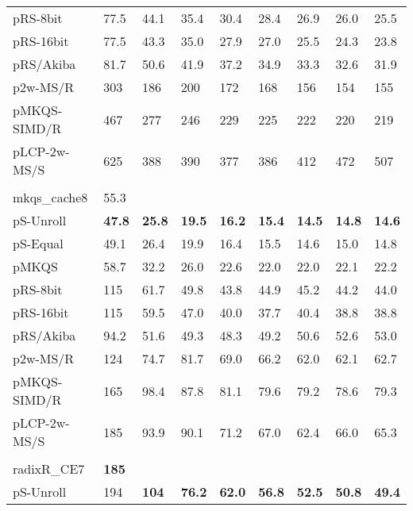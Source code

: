 \documentclass[a4paper]{myjournal}
\begin{document}
\begin{table}
\begin{tabularx}{\linewidth}{l|*{8}{>{\hfill}X}|@{}}
     pRS-8bit & 77.5 &     44.1 &     35.4 &     30.4 &     28.4 &     26.9 &     26.0 &     25.5 \\
    pRS-16bit & 77.5 &     43.3 &     35.0 &     27.9 &     27.0 &     25.5 &     24.3 &     23.8 \\
    pRS/Akiba & 81.7 &     50.6 &     41.9 &     37.2 &     34.9 &     33.3 &     32.6 &     31.9 \\
     p2w-MS/R &  303 &      186 &      200 &      172 &      168 &      156 &      154 &      155 \\
 pMKQS-SIMD/R &  467 &      277 &      246 &      229 &      225 &      222 &      220 &      219 \\
 pLCP-2w-MS/S &  625 &      388 &      390 &      377 &      386 &      412 &      472 &      507 \\ \hline
& \multicolumn{8}{l|}{\textbf{GOV2}, , , } \\ \cline{2-9}
mkqs\_cache8 & 55.3 &  &  &  &  &  &  &  \\
pS-Unroll & \bf 47.8 & \bf 25.8 & \bf 19.5 & \bf 16.2 & \bf 15.4 & \bf 14.5 & \bf 14.8 & \bf 14.6 \\
 pS-Equal &     49.1 &     26.4 &     19.9 &     16.4 &     15.5 &     14.6 &     15.0 &     14.8 \\
        pMKQS &     58.7 &     32.2 &     26.0 &     22.6 &     22.0 &     22.0 &     22.1 &     22.2 \\
     pRS-8bit &      115 &     61.7 &     49.8 &     43.8 &     44.9 &     45.2 &     44.2 &     44.0 \\
    pRS-16bit &      115 &     59.5 &     47.0 &     40.0 &     37.7 &     40.4 &     38.8 &     38.8 \\
    pRS/Akiba &     94.2 &     51.6 &     49.3 &     48.3 &     49.2 &     50.6 &     52.6 &     53.0 \\
     p2w-MS/R &      124 &     74.7 &     81.7 &     69.0 &     66.2 &     62.0 &     62.1 &     62.7 \\
 pMKQS-SIMD/R &      165 &     98.4 &     87.8 &     81.1 &     79.6 &     79.2 &     78.6 &     79.3 \\
 pLCP-2w-MS/S &      185 &     93.9 &     90.1 &     71.2 &     67.0 &     62.4 &     66.0 &     65.3 \\ \hline
& \multicolumn{8}{l|}{\textbf{Wikipedia}, , } \\ \cline{2-9}
radixR\_CE7 & \bf 185 &  &  &  &  &  &  &  \\
pS-Unroll & 194 & \bf 104 & \bf 76.2 & \bf 62.0 & \bf 56.8 & \bf 52.5 & \bf 50.8 & \bf 49.4 \\

\end{tabularx}
\end{table}
\end{document}
